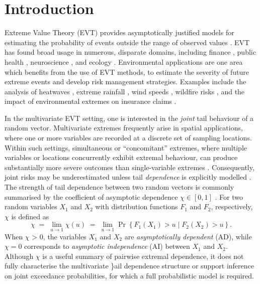 \documentclass[preprint,12pt,authoryear]{elsarticle}
\begin{document}
\setlength{\textfloatsep}{10pt plus 1pt minus 2pt}
\setlength{\intextsep}{8pt plus 1pt minus 2pt}
\setlength{\floatsep}{8pt plus 1pt minus 2pt}

\setlength{\abovedisplayskip}{8pt plus 2pt minus 4pt}
\setlength{\belowdisplayskip}{8pt plus 2pt minus 4pt}
\setlength{\abovedisplayshortskip}{4pt plus 2pt minus 4pt}
\setlength{\belowdisplayshortskip}{4pt plus 2pt minus 4pt}

\section{Introduction}
\label{sec:intro}
Extreme Value Theory (EVT) provides asymptotically justified models for estimating the probability of events outside the range of observed values \citep{Coles2001}.
EVT has found broad usage in numerous, disparate domains, including finance \citep{Poon2004}, public health \citep{Vettori2019}, neuroscience \citep{Talento2025}, and ecology \citep{Koh2025}.
Environmental applications are one area which benefits from the use of EVT methods, to estimate the severity of future extreme events and develop risk management strategies. 
Examples include the analysis of heatwaves \citep{tanarhte2015heat, french2019quantifying}, extreme rainfall \citep{osei2021estimation}, wind speeds \citep{steinkohl2013extreme, soukissian2015effect}, wildfire risks \citep{Koh2023}, and the impact of environmental extremes on insurance claims \citep{Rohrbeck_flooding_2018, Miralles2024}.

In the multivariate EVT setting, one is interested in the \emph{joint} tail behaviour of a random vector.
Multivariate extremes frequently arise in spatial applications, where one or more variables are recorded at a discrete set of sampling locations.
Within such settings, simultaneous or ``concomitant'' extremes, where multiple variables or locations concurrently exhibit extremal behaviour, can produce substantially more severe outcomes than single-variable extremes \citep{zscheischler2018future, bevacqua2021guidelines, Rohrbeck2021, Sando2022}.
Consequently, joint risks may be underestimated unless tail \emph{dependence} is explicitly modelled \citep{Zhang2024}. 
The strength of tail dependence between two random vectors is commonly summarised by the coefficient of asymptotic dependence \(\chi\in[0,1]\) \citep[see e.g.,][]{Coles1999}.
For two random variables $X_1$ and $X_2$ with distribution functions $F_1$ and $F_2$, respectively, $\chi$ is defined as
\begin{equation} \label{eq:chi}
  \chi \;=\; \lim_{u\to 1} \chi(u) \;=\; \lim_{u\to 1}\Pr\left\{F_1(X_1)>u \mid F_2(X_2)>u\right\}.
\end{equation}
When $\chi$ > 0, the variables $X_1$ and $X_2$ are \emph{asymptotically dependent} (AD), while $\chi=0$ corresponds to \emph{asymptotic independence} (AI) between $X_1$ and $X_2$.
Although \(\chi\) is a useful summary of pairwise extremal dependence, it does not fully characterise the multivariate \}ail dependence structure or support inference on joint exceedance probabilities, for which a full probabilistic model is required.
\end{document}
